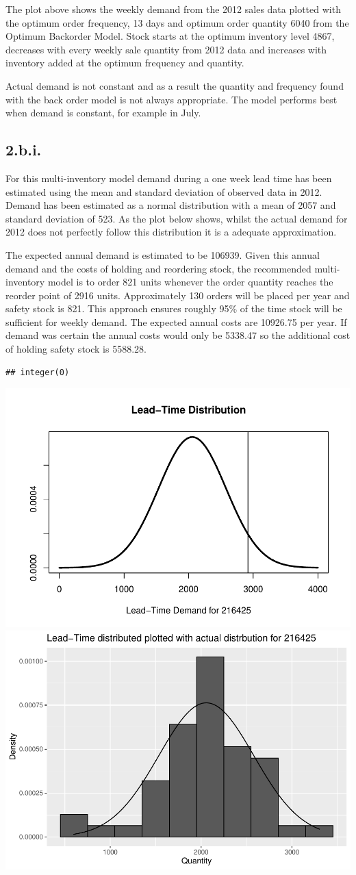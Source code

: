 \documentclass[
  11pt,
]{article}
\begin{document}
The plot above shows the weekly demand from the 2012 sales data plotted
with the optimum order frequency, 13 days and optimum order quantity
6040 from the Optimum Backorder Model. Stock starts at the optimum
inventory level 4867, decreases with every weekly sale quantity from
2012 data and increases with inventory added at the optimum frequency
and quantity.

Actual demand is not constant and as a result the quantity and frequency
found with the back order model is not always appropriate. The model
performs best when demand is constant, for example in July.

\hypertarget{b.i.}{%
\subsection{2.b.i.}\label{b.i.}}

For this multi-inventory model demand during a one week lead time has
been estimated using the mean and standard deviation of observed data in
2012. Demand has been estimated as a normal distribution with a mean of
2057 and standard deviation of 523. As the plot below shows, whilst the
actual demand for 2012 does not perfectly follow this distribution it is
a adequate approximation.

The expected annual demand is estimated to be 106939. Given this annual
demand and the costs of holding and reordering stock, the recommended
multi-inventory model is to order 821 units whenever the order quantity
reaches the reorder point of 2916 units. Approximately 130 orders will
be placed per year and safety stock is 821. This approach ensures
roughly 95\% of the time stock will be sufficient for weekly demand. The
expected annual costs are 10926.75 per year. If demand was certain the
annual costs would only be 5338.47 so the additional cost of holding
safety stock is 5588.28.

\begin{verbatim}
## integer(0)
\end{verbatim}

\includegraphics[width=0.5\linewidth]{Assignment-STAT702---final_files/figure-latex/2bi plots,figures-side-1}
\includegraphics[width=0.5\linewidth]{Assignment-STAT702---final_files/figure-latex/2bi plots,figures-side-2}
\end{document}
